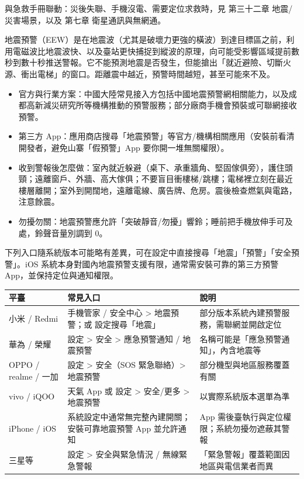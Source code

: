與急救手冊聯動：災後失聯、手機沒電、需要定位求救時，見 第三十二章 地震/災害場景，以及 第七章 衛星通訊與無網通。


地震預警（EEW）是在地震波（尤其是破壞力更強的橫波）到達目標區之前，利用電磁波比地震波快、以及臺站更快捕捉到縱波的原理，向可能受影響區域提前數秒到數十秒推送警報。它不能預測地震是否發生，但能搶出「就近避險、切斷火源、衝出電梯」的窗口。距離震中越近，預警時間越短，甚至可能來不及。

\begin{itemize}
  \item 官方與行業方案：中國大陸常見接入方包括中國地震預警網相關能力，以及成都高新減災研究所等機構推動的預警服務；部分廠商手機會預裝或可聯網接收預警。
  \item 第三方 App：應用商店搜尋「地震預警」等官方/機構相關應用（安裝前看清開發者，避免山寨「假預警」App 要你開一堆無關權限）。
  \item 收到警報後怎麼做：室內就近躲避（桌下、承重牆角、堅固傢俱旁），護住頭頸；遠離窗戶、外牆、高大傢俱；不要盲目衝樓梯/跳樓；電梯裡立刻在最近樓層離開；室外到開闊地，遠離電線、廣告牌、危房。震後檢查燃氣與電路，注意餘震。
  \item 勿擾勿關：地震預警應允許「突破靜音/勿擾」響鈴；睡前把手機放伸手可及處，鈴聲音量別調到 0。
\end{itemize}


下列入口隨系統版本可能略有差異，可在設定中直接搜尋「地震」「預警」「安全預警」。iOS 系統本身對國內地震預警支援有限，通常需安裝可靠的第三方預警 App，並保持定位與通知權限。

\begin{center}
\begin{tabularx}{\linewidth}{|X|X|X|}
\hline
\textbf{平臺} & \textbf{常見入口} & \textbf{說明} \tabularnewline
\hline
小米 / Redmi & 手機管家 / 安全中心 > 地震預警；或 設定搜尋「地震」 & 部分版本系統內建預警服務，需聯網並開啟定位 \tabularnewline
華為 / 榮耀 & 設定 > 安全 > 應急預警通知 / 地震預警 & 名稱可能是「應急預警通知」，內含地震等 \tabularnewline
OPPO / realme / 一加 & 設定 > 安全（SOS 緊急聯絡）> 地震預警 & 部分機型與地區服務覆蓋有關 \tabularnewline
vivo / iQOO & 天氣 App 或 設定 > 安全/更多 > 地震預警 & 以實際系統版本選單為準 \tabularnewline
iPhone / iOS & 系統設定中通常無完整內建開關；安裝可靠地震預警 App 並允許通知 & App 需後臺執行與定位權限；系統勿擾勿遮蔽其警報 \tabularnewline
三星等 & 設定 > 安全與緊急情況 / 無線緊急警報 & 「緊急警報」覆蓋範圍因地區與電信業者而異 \tabularnewline
\hline
\end{tabularx}
\end{center}

